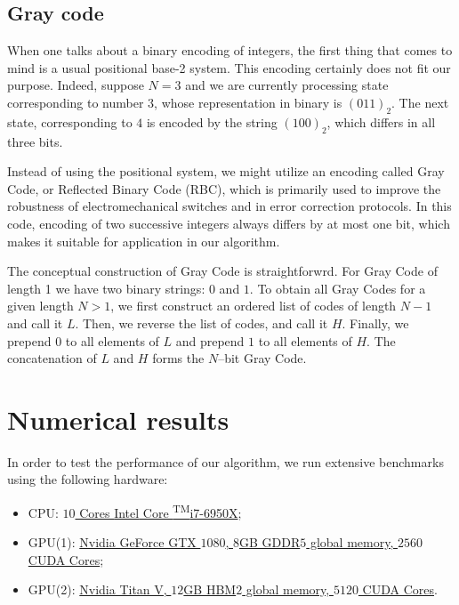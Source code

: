 \subsection{Gray code}
When one talks about a binary encoding of integers, the first thing that comes to mind is a usual positional base-2 system. This encoding certainly does not fit our purpose.
Indeed, suppose $N=3$ and we are currently processing state corresponding to number $3$, whose representation in binary is $(011)_{2}$. The next state, corresponding to $4$ is encoded by the string $(100)_{2}$, which differs in all three bits.

Instead of using the positional system, we might utilize an encoding called Gray Code, or Reflected Binary Code (RBC), which is primarily used to improve the robustness of electromechanical switches and in error correction protocols. In this code, encoding of two successive integers always differs by at most one bit, which makes it suitable for application in our algorithm.

The conceptual construction of Gray Code is straightforwrd. For Gray Code of length 1 we have two binary strings: $0$ and $1$. To obtain all Gray Codes for a given length $N > 1$, we first construct an ordered list of codes of length $N-1$ and call it $L$. Then, we reverse the list of codes, and call it $H$. Finally, we prepend $0$ to all elements of $L$ and prepend $1$ to all elements of $H$. The concatenation of $L$ and $H$ forms the $N$--bit Gray Code.
\section{Numerical results}
In order to test the performance of our algorithm, we run extensive benchmarks using the following hardware:
%
\begin{itemize}
\item CPU:
\href{https://ark.intel.com/products/94456/Intel-Core-i7-6950X-Processor-Extreme-Edition-25M-Cache-up-to-3-50-GHz-}{$10$
Cores {\rmfamily Intel\textregistered} Core \textsuperscript{TM}i7-6950X};
%
\item GPU(1): \href{https://www.nvidia.com/en-us/geforce/products/10series/geforce-gtx-1080}{Nvidia GeForce GTX $1080$, $8$GB GDDR$5$ global memory, $2560$ CUDA Cores};
%
\item  GPU(2): \href{https://www.nvidia.com/en-us/titan/titan-v/}{Nvidia Titan V, $12$GB HBM$2$ global memory, $5120$ CUDA Cores}.
\end{itemize}

